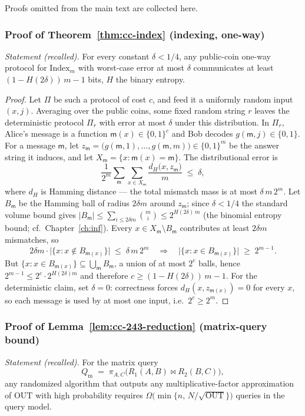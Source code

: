 Proofs omitted from the main text are collected here.

\subsubsection*{Proof of Theorem~\ref{thm:cc-index} (indexing, one-way)}
{\itshape Statement (recalled).} For every constant $\delta < 1/4$, any public-coin
one-way protocol for $\mathrm{Index}_m$ with worst-case error at most $\delta$
communicates at least $(1 - H(2\delta))\,m - 1$ bits, $H$ the binary entropy.\eop

\begin{proof}
Let $\Pi$ be such a protocol of cost $c$, and feed it a uniformly random input
$(x, j)$. Averaging over the public coins, some fixed random string $r$ leaves the
deterministic protocol $\Pi_r$ with error at most $\delta$ under this distribution.
In $\Pi_r$, Alice's message is a function $\mathsf{m}(x) \in \{0,1\}^c$ and Bob
decodes $g(\mathsf{m}, j) \in \{0,1\}$. For a message $\mathsf{m}$, let
$z_{\mathsf{m}} = \bigl(g(\mathsf{m},1), \dots, g(\mathsf{m},m)\bigr) \in
\{0,1\}^m$ be the answer string it induces, and let
$X_{\mathsf{m}} = \{x : \mathsf{m}(x) = \mathsf{m}\}$. The distributional error is
\[
\frac{1}{2^m} \sum_{\mathsf{m}} \sum_{x \in X_{\mathsf{m}}}
\frac{d_H\bigl(x, z_{\mathsf{m}}\bigr)}{m} \;\le\; \delta,
\]
where $d_H$ is Hamming distance --- the total mismatch mass is at most
$\delta\, m\, 2^m$. Let $B_{\mathsf{m}}$ be the Hamming ball of radius $2\delta m$
around $z_{\mathsf{m}}$; since $\delta < 1/4$ the standard volume bound gives
$|B_{\mathsf{m}}| \le \sum_{i \le 2\delta m}\binom{m}{i} \le 2^{H(2\delta)\,m}$ (the
binomial entropy bound; cf.\ Chapter~\ref{ch:inf}). Every $x \in
X_{\mathsf{m}} \setminus B_{\mathsf{m}}$ contributes at least $2\delta m$ mismatches,
so
\[
2\delta m \cdot \bigl|\{x : x \notin B_{\mathsf{m}(x)}\}\bigr|
\;\le\; \delta\, m\, 2^m
\quad\Longrightarrow\quad
\bigl|\{x : x \in B_{\mathsf{m}(x)}\}\bigr| \;\ge\; 2^{m-1}.
\]
But $\{x : x \in B_{\mathsf{m}(x)}\} \subseteq \bigcup_{\mathsf{m}}
B_{\mathsf{m}}$, a union of at most $2^c$ balls, hence $2^{m-1} \le 2^c \cdot
2^{H(2\delta)m}$ and therefore $c \ge (1 - H(2\delta))\,m - 1$. For the
deterministic claim, set $\delta = 0$: correctness forces
$d_H(x, z_{\mathsf{m}(x)}) = 0$ for every $x$, so each message is used by at most
one input, i.e.\ $2^c \ge 2^m$.
\end{proof}

\subsubsection*{Proof of Lemma~\ref{lem:cc-243-reduction} (matrix-query bound)}
{\itshape Statement (recalled).} For the matrix query
\[
Q_{\mathrm{m}} \;=\; \pi_{A,C}\bigl(R_1(A,B) \Join R_2(B,C)\bigr),
\]
any randomized algorithm that outputs any multiplicative-factor approximation of
$\mathrm{OUT}$ with high probability requires
$\Omega\bigl(\min\{n,\, N/\sqrt{\mathrm{OUT}}\}\bigr)$ queries in the query model.\eop

